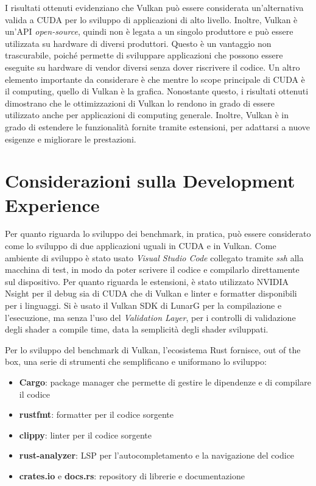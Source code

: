 I risultati ottenuti evidenziano che Vulkan può essere considerata un'alternativa valida a \gls{CUDA} per lo sviluppo di applicazioni di alto livello. Inoltre, Vulkan è un'\gls{API} \textit{open-source}, quindi non è legata a un singolo produttore e può essere utilizzata su hardware di diversi produttori. Questo è un vantaggio non trascurabile, poiché permette di sviluppare applicazioni che possono essere eseguite su hardware di vendor diversi senza dover riscrivere il codice. Un altro elemento importante da considerare è che mentre lo scope principale di \gls{CUDA} è il computing, quello di Vulkan è la grafica. Nonostante questo, i risultati ottenuti dimostrano che le ottimizzazioni di Vulkan lo rendono in grado di essere utilizzato anche per applicazioni di computing generale. Inoltre, Vulkan è in grado di estendere le funzionalità fornite tramite estensioni, per adattarsi a nuove esigenze e migliorare le prestazioni.

\section{Considerazioni sulla Development Experience}


Per quanto riguarda lo sviluppo dei benchmark, in pratica, può essere considerato come lo sviluppo di due applicazioni uguali in \gls{CUDA} e in Vulkan. Come ambiente di sviluppo è stato usato \textit{Visual Studio Code} collegato tramite \textit{ssh} alla macchina di test, in modo da poter scrivere il codice e compilarlo direttamente sul dispositivo. Per quanto riguarda le estensioni, è stato utilizzato NVIDIA Nsight \cite[]{NVIDIA:nsight} per il debug sia di \gls{CUDA} che di Vulkan e linter e formatter disponibili per i linguaggi. Si è usato il Vulkan SDK di LunarG \cite[]{KG:vulkan_sdk} per la compilazione e l'esecuzione, ma senza l'uso del \textit{Validation Layer}, per i controlli di validazione degli shader a compile time, data la semplicità degli shader sviluppati.


Per lo sviluppo del benchmark di Vulkan, l'ecosistema Rust fornisce, out of the box, una serie di strumenti che semplificano e uniformano lo sviluppo:

\begin{itemize}
    \item \textbf{Cargo}: package manager che permette di gestire le dipendenze e di compilare il codice
    \item \textbf{rustfmt}: formatter per il codice sorgente
    \item \textbf{clippy}: linter per il codice sorgente
    \item \textbf{rust-analyzer}: \gls{LSP} per l'autocompletamento e la navigazione del codice
    \item \textbf{crates.io} e \textbf{docs.rs}: repository di librerie e documentazione
\end{itemize}

